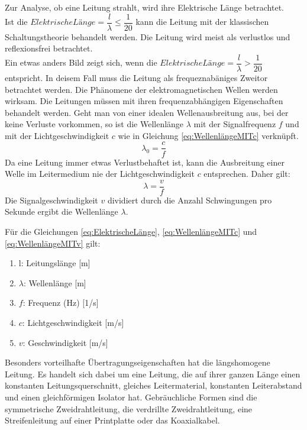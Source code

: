 Zur Analyse, ob eine Leitung strahlt, wird ihre Elektrische Länge betrachtet. \\
Ist die $Elektrische Länge=\dfrac{l}{\lambda} \le \dfrac{1}{20}$  kann die Leitung mit der klassischen Schaltungstheorie behandelt werden. Die Leitung wird meist als verlustlos und reflexionsfrei betrachtet.\\
Ein etwas anders Bild zeigt sich, wenn die $Elektrische Länge=\dfrac{l}{\lambda}>\dfrac{1}{20}$ entspricht. In deisem Fall muss die Leitung als frequeznabäniges Zweitor betrachtet werden. Die Phänomene der elektromagnetischen Wellen werden wirksam. Die Leitungen müssen mit ihren frequenzabhängigen Eigenschaften behandelt werden. 
Geht man von einer idealen Wellenausbreitung aus, bei der keine Verluste vorkommen, so ist die Wellenlänge $\lambda$ mit der Signalfrequenz $f$ und mit der Lichtgeschwindigkeit $c$ wie in Gleichung \ref{eq:WellenlängeMITc} verknüpft.
\begin{equation}
\lambda_{0}=\dfrac{c}{f}\label{eq:WellenlängeMITc}
\end{equation}
Da eine Leitung immer etwas Verlustbehaftet ist, kann die Ausbreitung einer Welle im Leitermedium nie der Lichtgeschwindigkeit $c$ entsprechen. Daher gilt:
\begin{equation}
\lambda=\dfrac{v}{f}\label{eq:WellenlängeMITv}
\end{equation}
Die Signalgeschwindigkeit $v$ dividiert durch die Anzahl Schwingungen pro Sekunde ergibt die Wellenlänge $\lambda$.

Für die Gleichungen \ref{eq:ElektrischeLänge}, \ref{eq:WellenlängeMITc} und \ref{eq:WellenlängeMITv} gilt:
\begin{enumerate}[leftmargin=2cm]
   \item[] l: Leitungslänge [m] 
   \item[] $\lambda$: Wellenlänge  [m] 
   \item[] $f$: Frequenz (Hz) [1/s] 
   \item[] $c$: Lichtgeschwindigkeit  [m/s] 
   \item[] $v$: Geschwindigkeit  [m/s] 
\end{enumerate} 
Besonders vorteilhafte Übertragungseigenschaften hat die längshomogene Leitung. Es handelt sich dabei um eine Leitung, die auf ihrer ganzen Länge einen konstanten Leitungsquerschnitt, gleiches
Leitermaterial, konstanten Leiterabstand und einen gleichförmigen Isolator hat. Gebräuchliche Formen sind die symmetrische Zweidrahtleitung, die verdrillte Zweidrahtleitung, eine Streifenleitung auf
einer Printplatte oder das Koaxialkabel.
